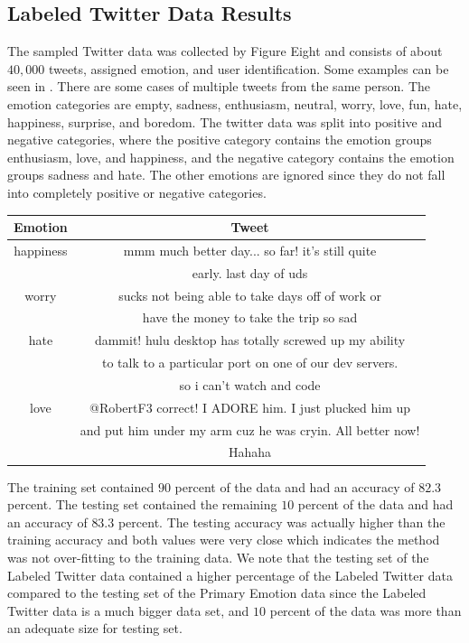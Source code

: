 \documentclass[titlepage,letterpaper]{article}
\begin{document}
\subsection{Labeled Twitter Data Results}

The sampled Twitter data was collected by Figure Eight \cite{LabeledTwitter} and consists of about $40,000$ tweets, assigned emotion, and user identification. Some examples can be seen in . There are some cases of multiple tweets from the same person. The emotion categories are empty, sadness, enthusiasm, neutral, worry, love, fun, hate, happiness, surprise, and boredom. The twitter data was split into positive and negative categories, where the positive category contains the emotion groups enthusiasm, love, and happiness, and the negative category contains the emotion groups sadness and hate. The other emotions are ignored since they do not fall into completely positive or negative categories. 

 \begin{center}
	\begin{tabular}{ |c|c| } 
		\hline
		Emotion & Tweet \\
		\hline \hline
		happiness & mmm much better day... so far! it's still quite\\
		 & early. last day of uds \\
		\hline
		worry &  sucks not being able to take days off of work or \\
		& have the money to take the trip  so sad \\
		\hline
		hate & dammit! hulu desktop has totally screwed up my ability \\
		& to talk to a particular port on one of our dev servers. \\
		& so i can't watch and code  \\ 
		\hline
		love & @RobertF3 correct! I ADORE him. I just plucked him up \\ 
		& and put him under my arm cuz he was cryin.  All better now! \\ & Hahaha \\
		\hline
	\end{tabular}
	\label{TwitterLabeledTable}
\end{center}

The training set contained $90$ percent of the data and had an accuracy of $82.3$ percent. The testing set contained the remaining $10$ percent of the data and had an accuracy of $83.3$ percent. The testing accuracy was actually higher than the training accuracy and both values were very close which indicates the method was not over-fitting to the training data. We note that the testing set of the Labeled Twitter data contained a higher percentage of the Labeled Twitter data compared to the testing set of the Primary Emotion data since the Labeled Twitter data is a much bigger data set, and $10$ percent of the data was more than an adequate size for testing set. 
\end{document}
